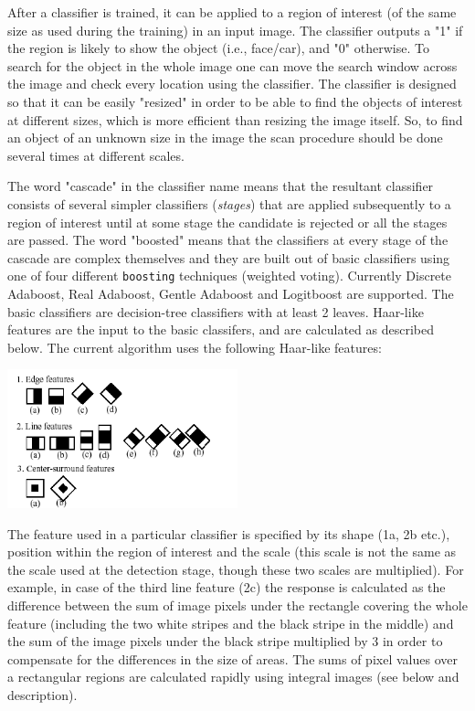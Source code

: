 After a classifier is trained, it can be applied to a region of interest
(of the same size as used during the training) in an input image. The
classifier outputs a "1" if the region is likely to show the object
(i.e., face/car), and "0" otherwise. To search for the object in the
whole image one can move the search window across the image and check
every location using the classifier. The classifier is designed so that
it can be easily "resized" in order to be able to find the objects of
interest at different sizes, which is more efficient than resizing the
image itself. So, to find an object of an unknown size in the image the
scan procedure should be done several times at different scales.

The word "cascade" in the classifier name means that the resultant
classifier consists of several simpler classifiers (\emph{stages}) that
are applied subsequently to a region of interest until at some stage the
candidate is rejected or all the stages are passed. The word "boosted"
means that the classifiers at every stage of the cascade are complex
themselves and they are built out of basic classifiers using one of four
different \texttt{boosting} techniques (weighted voting). Currently
Discrete Adaboost, Real Adaboost, Gentle Adaboost and Logitboost are
supported. The basic classifiers are decision-tree classifiers with at
least 2 leaves. Haar-like features are the input to the basic classifers,
and are calculated as described below. The current algorithm uses the
following Haar-like features:

\includegraphics[width=0.5\textwidth]{pics/haarfeatures.png}

The feature used in a particular classifier is specified by its shape (1a, 2b etc.), position within the region of interest and the scale (this scale is not the same as the scale used at the detection stage, though these two scales are multiplied). For example, in case of the third line feature (2c) the response is calculated as the difference between the sum of image pixels under the rectangle covering the whole feature (including the two white stripes and the black stripe in the middle) and the sum of the image pixels under the black stripe multiplied by 3 in order to compensate for the differences in the size of areas. The sums of pixel values over a rectangular regions are calculated rapidly using integral images (see below and  description).

